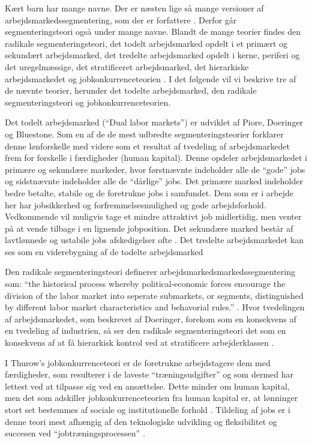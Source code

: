 Kært barn har mange navne. Der er næsten lige så mange versioner af arbejdsmarkedssegmentering, som der er forfattere \parencite[77]{Leontaridi1998}. Derfor går segmenteringsteori også under mange navne. Blandt de mange teorier findes den radikale segmenteringsteori, det todelt arbejdsmarked opdelt i et primært og sekundært arbejdsmarked, det tredelte arbejdsmarked opdelt i kerne, periferi og det uregelmæssige, det stratificeret arbejdsmarked, det hierarkiske arbejdsmarkedet og jobkonkurrenceteorien \parencite[1215]{Cain1976}. I det følgende vil vi beskrive tre af de nævnte teorier, herunder det todelte arbejdsmarked, den radikale segmenteringsteori og jobkonkurrenceteorien.

Det todelt arbejdsmarked (“Dual labor markets”) er udviklet af Piore, Doeringer og Bluestone. Som en af de de mest udbredte segmenteringsteorier forklarer denne lønforskelle med videre som et resultat af tvedeling af arbejdsmarkedet frem for forskelle i færdigheder (human kapital). Denne opdeler arbejdsmarkedet i primære og sekundære markeder, hvor førstnævnte indeholder alle de “gode” jobs og sidstnævnte indeholder alle de “dårlige” jobs. Det primære marked indeholder bedre betalte, stabile og de foretrukne jobs i samfundet. Dem som er i arbejde her har jobsikkerhed og forfremmelsesmulighed og gode arbejdsforhold. Vedkommende vil muligvis tage et mindre attraktivt job midlertidig, men venter på at vende tilbage i en lignende jobposition. Det sekundære marked består af lavtlønnede og ustabile jobs afskedigelser ofte \parencite[70]{Doeringer1971}. Det tredelte arbejdsmarkedet kan ses som en viderebygning af de todelte arbejdsmarked

Den radikale segmenteringsteori definerer arbejdsmarkedsmarkedssegmentering som: “the historical process whereby political-economic forces encourage the division of the labor market into seperate submarkets, or segments, distinguished by different labor market characteristics and behavorial rules.” \parencite[359]{Reich1973}. Hvor tvedelingen af arbejdsmarkedet, som beskrevet af Doeringer, forekom som en konsekvens af en tvedeling af industrien, så ser den radikale segmenteringsteori det som en konsekvens af at få hierarkisk kontrol ved at stratificere arbejderklassen \parencite[63]{Leontaridi1998}.

I Thurow's jobkonkurrenceteori er de foretrukne arbejdstagere dem med færdigheder, som resulterer i de laveste “træningsudgifter” og som dermed har lettest ved at tilpasse sig ved en ansættelse. Dette minder om human kapital, men det som adskiller jobkonkurrenceteorien fra human kapital er, at lønninger stort set bestemmes af sociale og institutionelle forhold \parencite[1221]{Cain1976}. Tildeling af jobs er i denne teori mest afhængig af den teknologiske udvikling og fleksibilitet og succesen ved “jobtræningsprocessen” \parencite[74]{Leontaridi1998}.


